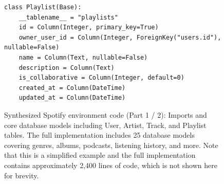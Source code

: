 \begin{figure}[t]
\begin{minipage}{0.97\textwidth}
\begin{lstlisting}[style=pythonstyle, firstnumber=1]
class Playlist(Base):
    __tablename__ = "playlists"
    id = Column(Integer, primary_key=True)
    owner_user_id = Column(Integer, ForeignKey("users.id"), nullable=False)
    name = Column(Text, nullable=False)
    description = Column(Text)
    is_collaborative = Column(Integer, default=0)
    created_at = Column(DateTime)
    updated_at = Column(DateTime)
\end{lstlisting}
\end{minipage}
\caption{Synthesized Spotify environment code (Part 1 / 2): Imports and core database models including User, Artist, Track, and Playlist tables. The full implementation includes 25 database models covering genres, albums, podcasts, listening history, and more. Note that this is a simplified example and the full implementation contains approximately 2,400 lines of code, which is not shown here for brevity.}
\label{fig:env-code-part1}
\end{figure}

